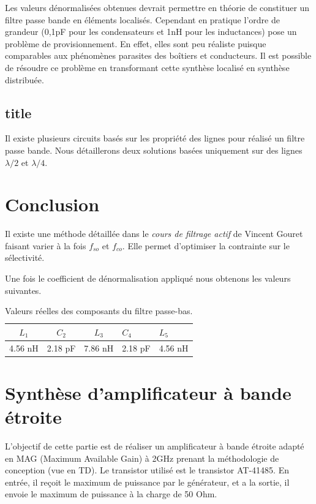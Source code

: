 \documentclass[french]{article}
\begin{document}
Les valeurs dénormalisées obtenues devrait permettre en théorie de constituer un filtre passe bande en éléments localisés. Cependant en pratique l'ordre de grandeur (0,1pF pour les condensateurs et 1nH pour les inductances) pose un problème de provisionnement. En effet, elles sont peu réaliste puisque comparables aux phénomènes parasites des boîtiers et conducteurs. Il est possible de résoudre ce problème en transformant cette synthèse localisé en synthèse distribuée.

\subsection{title}
Il existe plusieurs circuits basés sur les propriété des lignes pour réalisé un filtre passe bande. Nous détaillerons deux solutions basées uniquement sur des lignes $\lambda /2$ et $\lambda /4$. 

\section{Conclusion}
Il existe une méthode détaillée dans le \textit{cours de filtrage actif} de Vincent Gouret faisant varier à la fois $f_{so}$ et $f_{co}$. Elle permet d'optimiser la contrainte sur le sélectivité. 




Une fois le coefficient de dénormalisation appliqué nous obtenons les valeurs suivantes.

\begin{table}[H]
	\centering
	\begin{tabular}{|c|c|c|p{2cm}|p{2cm}|}
		\hline
		$L_1$ & $C_2$ & $L_3$ & $C_4$ & $L_5$\\
		\hline
		4.56 nH & 2.18 pF & 7.86 nH & 2.18 pF & 4.56 nH\\
		\hline
	\end{tabular}
	\caption{Valeurs réelles des composants du filtre passe-bas.}
	\label{tab:valeurs_composant_passe_bas}
\end{table}

\newpage
\section{Synthèse d'amplificateur à bande étroite}
L’objectif de cette partie est de réaliser un amplificateur à bande étroite adapté en MAG (Maximum Available Gain) à 2GHz prenant la méthodologie de conception (vue en TD). Le transistor utilisé est le transistor AT-41485. En entrée, il reçoit le maximum de puissance par le générateur, et a la sortie, il envoie le maximum de puissance à la charge de 50 Ohm.
\end{document}
